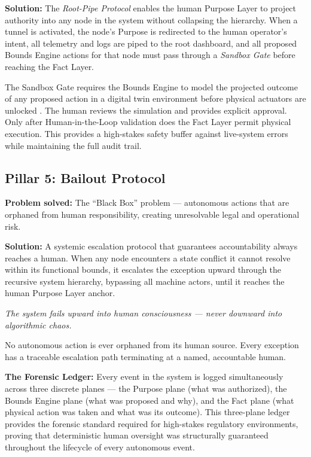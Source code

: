 \documentclass[12pt]{article}
\theoremstyle{plain}
\begin{document}
\textbf{Solution:} The \textit{Root-Pipe Protocol} enables the human Purpose Layer to project authority into any node in the system without collapsing the hierarchy. When a tunnel is activated, the node's Purpose is redirected to the human operator's intent, all telemetry and logs are piped to the root dashboard, and all proposed Bounds Engine actions for that node must pass through a \textit{Sandbox Gate} before reaching the Fact Layer.

The Sandbox Gate requires the Bounds Engine to model the projected outcome of any proposed action in a digital twin environment before physical actuators are unlocked \cite{leveson2011}. The human reviews the simulation and provides explicit approval. Only after Human-in-the-Loop validation does the Fact Layer permit physical execution. This provides a high-stakes safety buffer against live-system errors while maintaining the full audit trail.

\subsection{Pillar 5: Bailout Protocol}

\textbf{Problem solved:} The ``Black Box'' problem --- autonomous actions that are orphaned from human responsibility, creating unresolvable legal and operational risk.

\textbf{Solution:} A systemic escalation protocol that guarantees accountability always reaches a human. When any node encounters a state conflict it cannot resolve within its functional bounds, it escalates the exception upward through the recursive system hierarchy, bypassing all machine actors, until it reaches the human Purpose Layer anchor.

\textit{The system fails upward into human consciousness --- never downward into algorithmic chaos.}

No autonomous action is ever orphaned from its human source. Every exception has a traceable escalation path terminating at a named, accountable human.

\textbf{The Forensic Ledger:} Every event in the system is logged simultaneously across three discrete planes --- the Purpose plane (what was authorized), the Bounds Engine plane (what was proposed and why), and the Fact plane (what physical action was taken and what was its outcome). This three-plane ledger provides the forensic standard required for high-stakes regulatory environments, proving that deterministic human oversight was structurally guaranteed throughout the lifecycle of every autonomous event.
\end{document}
